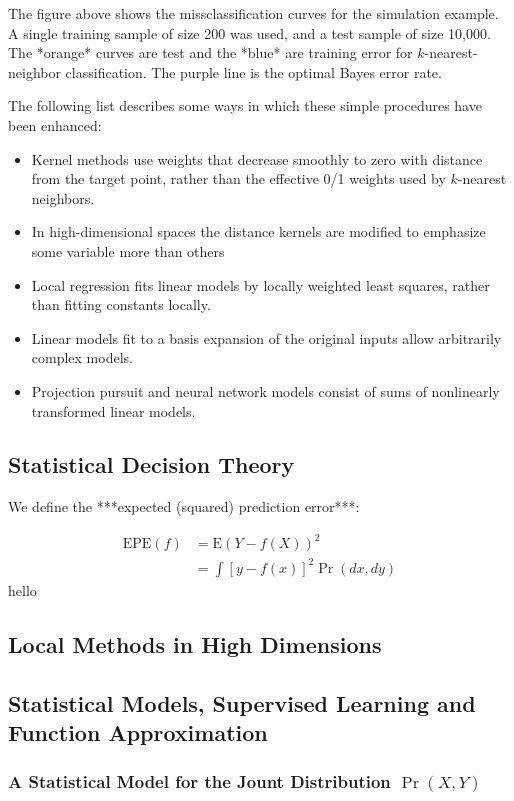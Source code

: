 The figure above shows the missclassification curves for the simulation example. A single training sample of size 200 was used, and a test sample of size 10,000. The *orange* curves are test and the *blue* are training error for $k$-nearest-neighbor classification. The purple line is the optimal Bayes error rate.

The following list describes some ways in which these simple procedures have been enhanced:
\begin{itemize}
	\item Kernel methods use weights that decrease smoothly to zero with distance from the target point, rather than the effective 0/1 weights used by $k$-nearest neighbors.
	\item In high-dimensional spaces the distance kernels are modified to emphasize some variable more than others
	\item Local regression fits linear models by locally weighted least squares, rather than fitting constants locally.
	\item Linear models fit to a basis expansion of the original inputs allow arbitrarily complex models.
	\item Projection pursuit and neural network models consist of sums of nonlinearly transformed linear models.
\end{itemize}

\subsection{Statistical Decision Theory}
We define the ***expected (squared) prediction error***:

\begin{align}
	\text{EPE}(f) &= \text{E}(Y - f(X))^2 \\
	&= \int [y - f(x)]^2 \Pr(dx,dy)
\end{align}
hello


\subsection{Local Methods in High Dimensions}

\subsection{Statistical Models, Supervised Learning and Function Approximation}

\subsubsection{A Statistical Model for the Jount Distribution $\Pr(X,Y)$}
